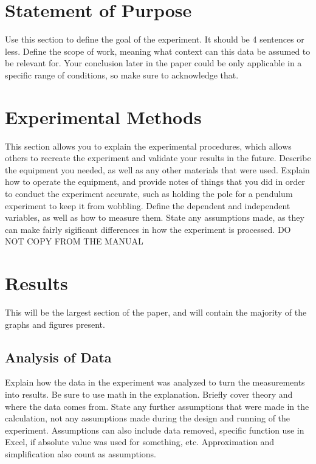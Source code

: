 \documentclass[11pt, letterpaper, notitlepage]{article}
\begin{document}
\begin{multicols}{2}
    \section*{Statement of Purpose}
    Use this section to define the goal of the experiment. It should be 4 sentences or 
    less. Define the scope of work, meaning what context can this data be assumed to 
    be relevant for. Your conclusion later in the paper could be only applicable in a 
    specific range of conditions, so make sure to acknowledge that.

    \section*{Experimental Methods}
    This section allows you to explain the experimental procedures, which allows 
    others to recreate the experiment and validate your results in the future. 
    Describe the equipment you needed, as well as any other materials that were used. 
    Explain how to operate the equipment, and provide notes of things that you did in 
    order to conduct the experiment accurate, such as holding the pole for a pendulum 
    experiment to keep it from wobbling. Define the dependent and independent 
    variables, as well as how to measure them. State any assumptions made, as they can 
    make fairly sigificant differences in how the experiment is processed. DO NOT COPY 
    FROM THE MANUAL

    \section*{Results}
    This will be the largest section of the paper, and will contain the majority of 
    the graphs and figures present.

    \subsection*{Analysis of Data}
    Explain how the data in the experiment was analyzed to turn the measurements into 
    results. Be sure to use math in the explanation. Briefly cover theory and where 
    the data comes from. State any further assumptions that were made in the 
    calculation, not any assumptions made during the design and running of the 
    experiment. Assumptions can also include data removed, specific function use in 
    Excel, if absolute value was used for something, etc. Approximation and 
    simplification also count as assumptions.
    

\end{multicols}
\end{document}
